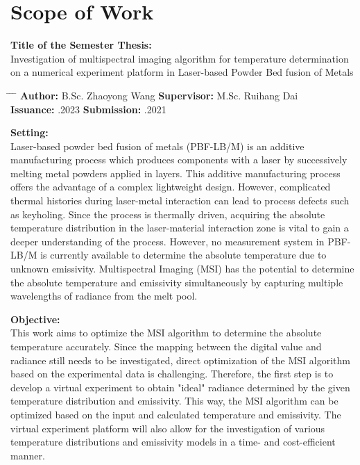 \chapter*{Scope of Work}


\textbf{Title of the Semester Thesis:}\\
\Large{Investigation of multispectral imaging algorithm for temperature
determination on a numerical experiment platform in Laser-based 
Powder Bed fusion of Metals}\\
\normalsize

\begin{tabbing}
	\hspace{7em} 		\= \hspace{13em}			\= \hspace{7em} 		\= \kill
	\textbf{Author:}  \> B.Sc. Zhaoyong Wang 	\> \textbf{Supervisor:} 	\>  M.Sc. Ruihang Dai \\
	\textbf{Issuance:} 	.2023 	\> \textbf{Submission:} 	.2021
\end{tabbing}

\textbf{Setting:}\\
Laser-based powder bed fusion of metals (PBF-LB/M) is an additive manufacturing
process which produces components with a laser by successively melting metal
powders applied in layers. This additive manufacturing process offers the advantage
of a complex lightweight design. However, complicated thermal histories
during laser-metal interaction can lead to process defects such as keyholing. Since
the process is thermally driven, acquiring the absolute temperature distribution in
the laser-material interaction zone is vital to gain a deeper understanding of the
process. However, no measurement system in PBF-LB/M is currently available to
determine the absolute temperature due to unknown emissivity. Multispectral Imaging
(MSI) has the potential to determine the absolute temperature and emissivity
simultaneously by capturing multiple wavelengths of radiance from the melt pool.


\textbf{Objective:}\\
This work aims to optimize the MSI algorithm to determine the absolute temperature
accurately. Since the mapping between the digital value and radiance still
needs to be investigated, direct optimization of the MSI algorithm based on the experimental
data is challenging. Therefore, the first step is to develop a virtual experiment
to obtain "ideal" radiance determined by the given temperature distribution
and emissivity. This way, the MSI algorithm can be optimized based on the input
and calculated temperature and emissivity. The virtual experiment platform will also
allow for the investigation of various temperature distributions and emissivity models
in a time- and cost-efficient manner.%

